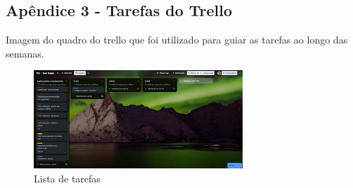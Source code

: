 \begin{apendicesenv}
\chapter{Apêndice 3 - Tarefas do Trello}

Imagem do quadro do trello que foi utilizado para guiar as tarefas ao longo das semanas.

\begin{figure}[htbp]
    \centering
    \caption{Lista de tarefas}
    \label{fig:trello-tarefas}
    \includegraphics[width=0.7\textwidth]{figuras/trello-quadro.png}
\end{figure}


\end{apendicesenv}
